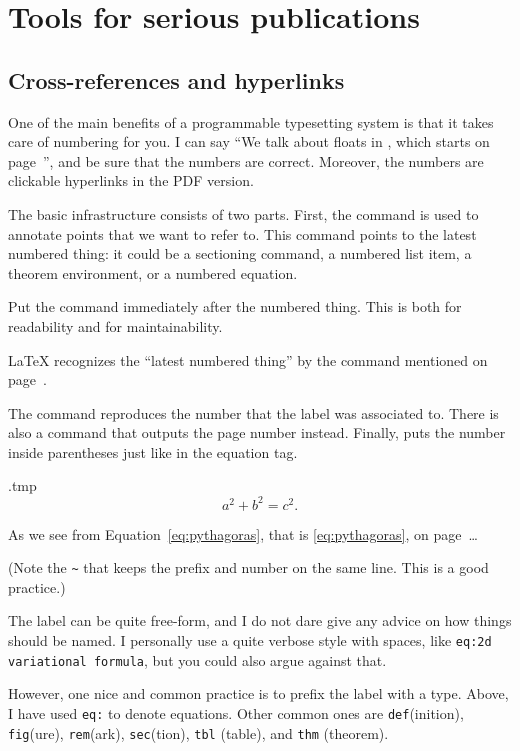 \chapter{Tools for serious publications}

\section{Cross-references and hyperlinks}\label{sec:crossref}

One of the main benefits of a programmable typesetting system is
that it takes care of numbering for you.
I can say ``We talk about floats in , which starts on page~\pageref{sec:floats}'',
and be sure that the numbers are correct.
Moreover, the numbers are clickable hyperlinks in the PDF version.

The basic infrastructure consists of two parts.
First, the  command is used to annotate points that we want to refer to.
This command points to the latest numbered thing:
it could be a sectioning command, a numbered list item, a theorem environment,
or a numbered equation.

\begin{practices}
Put the  command immediately after the numbered thing.
This is both for readability and for maintainability.
\end{practices}

\begin{technote}
\LaTeX{} recognizes the ``latest numbered thing''
by the  command mentioned on page~\pageref{rem:refstepcounter}.
\end{technote}

The  command reproduces the number that the label was associated to.
There is also a  command that outputs the page number instead.
Finally,  puts the number inside parentheses just like in the equation tag.
%
\begin{VerbatimOut}{\jobname.tmp}
\begin{equation}\label{eq:pythagoras}
  a^2 + b^2 = c^2.
\end{equation}

As we see from Equation~\ref{eq:pythagoras},
that is \eqref{eq:pythagoras},
on page~\pageref{eq:pythagoras}\dots
\end{VerbatimOut}
\ShowExample
%
(Note the \verb|~| that keeps the prefix and number on the same line.
This is a good practice.)

\begin{practices}
The label can be quite free-form,
and I do not dare give any advice on how things should be named.
I personally use a quite verbose style with spaces,
like \texttt{eq:2d variational formula},
but you could also argue against that.

However, one nice and common practice is to prefix the label with a type.
Above, I have used \verb|eq:| to denote equations.
Other common ones are
\verb|def|(inition), \verb|fig|(ure), \verb|rem|(ark), \verb|sec|(tion),
\verb|tbl| (table), and \verb|thm| (theorem).
\end{practices}

